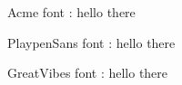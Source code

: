 \documentclass[]{article}
\begin{document}
{\fontsize{20pt}{0}
    \selectfont\Acmefont
    Acme font : hello there
    
    \selectfont\handfont 
    PlaypenSans font : hello there

    \selectfont\fancyfont 
    GreatVibes font : hello there
    
}
\end{document}
